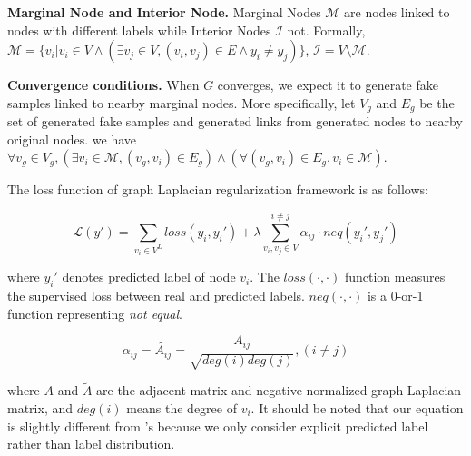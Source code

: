 \begin{definition}\label{marginal}\textbf{Marginal Node and Interior Node.}
Marginal Nodes $\mathcal{M}$ are nodes linked to nodes with different labels while Interior Nodes $\mathcal{I}$ not. Formally, $\mathcal{M} = \{v_i | v_i \in V \land (\exists v_j \in V, (v_i, v_j) \in E \land y_i \neq y_j)\}$, $\mathcal{I} = V \setminus \mathcal{M}$.
\end{definition}

\begin{assumption} \label{convergence}\textbf{Convergence conditions.} 
When $G$ converges, we expect it to generate fake samples linked to nearby marginal nodes. More specifically, let $V_g$ and $E_g$ be the set of generated fake samples and generated links from generated  nodes to nearby original nodes. we have  $\forall v_g \in V_g, (\exists v_i \in \mathcal{M}, (v_g, v_i) \in E_g) \land (\forall (v_g, v_i) \in E_g, v_i \in \mathcal{M}) $.  
\end{assumption}
\vspace{0.06in}

The loss function of graph Laplacian regularization framework is as follows:

\begin{equation}\label{basic}
	\mathcal{L}(y') = \sum\limits_{v_i\in V^L} loss(y_i, y_i') + \lambda\sum\limits_{v_i,v_j \in V}^{i\neq j} \alpha_{ij}\cdot neq(y_i', y_j')
\end{equation}

\noindent where $y_i'$ denotes predicted label of node $v_i$. The $loss(\cdot, \cdot)$ function measures the supervised loss between real and predicted labels. $neq(\cdot, \cdot)$ is a  0-or-1 function representing {\it not equal}.

\begin{equation}\label{alpha}
\alpha_{ij} = \tilde{A_{ij}} = \frac{A_{ij}}{\sqrt{deg(i)deg(j)}}, (i \neq j)
\end{equation} 

\noindent where $A$ and $\tilde{A}$ are the adjacent matrix and negative normalized graph Laplacian matrix, and $deg(i)$ means the degree of $v_i$. It should be noted that our equation is slightly different from \cite{zhou2004learning}'s because we only consider explicit predicted label rather than label distribution.

